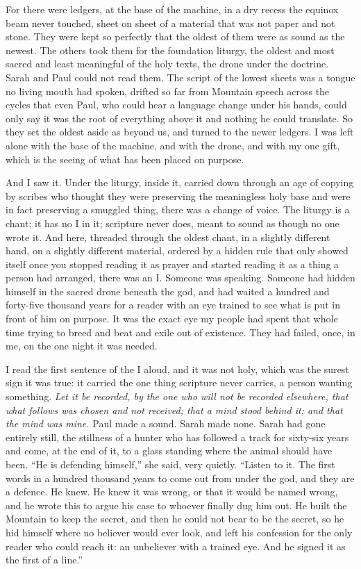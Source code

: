 For there were ledgers, at the base of the machine, in a dry recess the equinox beam never touched, sheet on sheet of a material that was not paper and not stone. They were kept so perfectly that the oldest of them were as sound as the newest. The others took them for the foundation liturgy, the oldest and most sacred and least meaningful of the holy texts, the drone under the doctrine. Sarah and Paul could not read them. The script of the lowest sheets was a tongue no living mouth had spoken, drifted so far from Mountain speech across the cycles that even Paul, who could hear a language change under his hands, could only say it was the root of everything above it and nothing he could translate. So they set the oldest aside as beyond us, and turned to the newer ledgers. I was left alone with the base of the machine, and with the drone, and with my one gift, which is the seeing of what has been placed on purpose.\par

And I saw it. Under the liturgy, inside it, carried down through an age of copying by scribes who thought they were preserving the meaningless holy base and were in fact preserving a smuggled thing, there was a change of voice. The liturgy is a chant; it has no I in it; scripture never does, meant to sound as though no one wrote it. And here, threaded through the oldest chant, in a slightly different hand, on a slightly different material, ordered by a hidden rule that only showed itself once you stopped reading it as prayer and started reading it as a thing a person had arranged, there was an I. Someone was speaking. Someone had hidden himself in the sacred drone beneath the god, and had waited a hundred and forty-five thousand years for a reader with an eye trained to see what is put in front of him on purpose. It was the exact eye my people had spent that whole time trying to breed and beat and exile out of existence. They had failed, once, in me, on the one night it was needed.\par

I read the first sentence of the I aloud, and it was not holy, which was the surest sign it was true: it carried the one thing scripture never carries, a person wanting something. \emph{Let it be recorded, by the one who will not be recorded elsewhere, that what follows was chosen and not received; that a mind stood behind it; and that the mind was mine.} Paul made a sound. Sarah made none. Sarah had gone entirely still, the stillness of a hunter who has followed a track for sixty-six years and come, at the end of it, to a glass standing where the animal should have been. ``He is defending himself,'' she said, very quietly. ``Listen to it. The first words in a hundred thousand years to come out from under the god, and they are a defence. He knew. He knew it was wrong, or that it would be named wrong, and he wrote this to argue his case to whoever finally dug him out. He built the Mountain to keep the secret, and then he could not bear to be the secret, so he hid himself where no believer would ever look, and left his confession for the only reader who could reach it: an unbeliever with a trained eye. And he signed it as the first of a line.''\par

